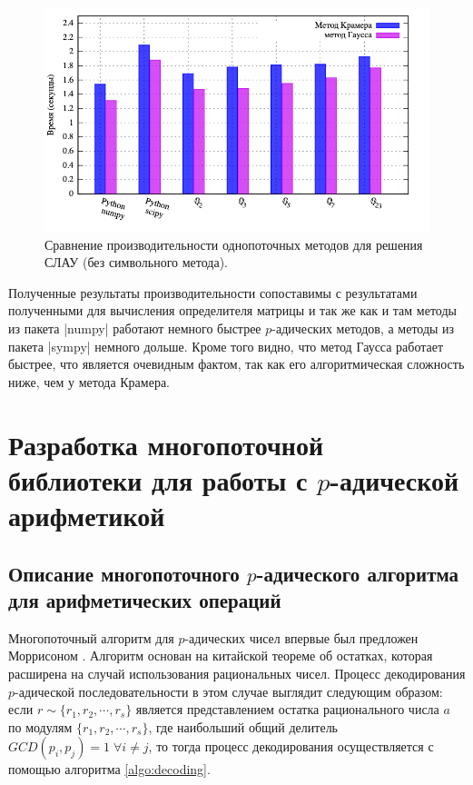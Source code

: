 \documentclass[master, och, diploma, times]{sty/SCWorks}
\theoremstyle{plain}
\theoremstyle{definition}
\numberwithin{equation}{section}
\begin{document}
\begin{figure}[H]
\centerline{\includegraphics[width=0.85\linewidth]{../gnuplot/single/system/wosymb.png}}
\caption{Сравнение производительности однопоточных методов для решения СЛАУ (без символьного метода).}
\label{img:single:system:2}
\end{figure}
 
 
Полученные результаты производительности сопоставимы с результатами полученными для вычисления определителя матрицы и так же как и там методы из пакета |numpy| работают немного быстрее $p$-адических методов, а методы из пакета |sympy| немного дольше. Кроме того видно, что метод Гаусса работает быстрее, что является очевидным фактом, так как его алгоритмическая сложность ниже, чем у метода Крамера.
 
\section{Разработка многопоточной библиотеки для работы с $p$-адической арифметикой}

\subsection{Описание многопоточного $p$-адического алгоритма для арифметических операций}

Многопоточный алгоритм для $p$-адических чисел впервые был предложен Моррисоном \cite{bib:numbers:morrison}. Алгоритм основан на китайской теореме об остатках, которая расширена на случай использования рациональных чисел. Процесс декодирования $p$-адической последовательности в этом случае выглядит следующим образом: если $r \sim \{r_1,r_2,\cdots, r_s\}$ является представлением остатка рационального числа $a$ по модулям $\{r_1,r_2,\cdots, r_s\}$, где наибольший общий делитель $GCD(p_i, p_j) =1 \; \forall i \neq j$, то тогда процесс декодирования осуществляется с помощью алгоритма \ref{algo:decoding}\cite{bib:numbers:newman}\cite{bib:numbers:dixon}.
\end{document}

